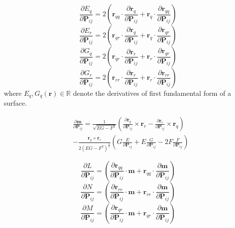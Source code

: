 \documentclass[journal]{IEEEtran}
\renewcommand{\vec}[1]{\mathbf{#1}}
\theoremstyle{definition}
\renewcommand{\vec}[1]{\mathbf{#1}}
\begin{document}
\begin{equation}
  \frac{\partial E_q}{\partial \mathbf{P}_{ij}} = 2\left(\mathbf{r}_{qq} \cdot \frac{\partial \mathbf{r}_{q}}{\partial \mathbf{P}_{ij}} + \mathbf{r}_{q} \cdot \frac{\partial \mathbf{r}_{qq}}{\partial \mathbf{P}_{ij}}\right)
\end{equation}
\begin{equation}
  \frac{\partial E_r}{\partial \mathbf{P}_{ij}} = 2\left(\mathbf{r}_{qr} \cdot \frac{\partial \mathbf{r}_{q}}{\partial \mathbf{P}_{ij}} + \mathbf{r}_{q} \cdot \frac{\partial \mathbf{r}_{qr}}{\partial \mathbf{P}_{ij}}\right)
\end{equation}
\begin{equation}
  \frac{\partial G_q}{\partial \mathbf{P}_{ij}} = 2\left(\mathbf{r}_{qr} \cdot \frac{\partial \mathbf{r}_{r}}{\partial \mathbf{P}_{ij}} + \mathbf{r}_{r} \cdot \frac{\partial \mathbf{r}_{qr}}{\partial \mathbf{P}_{ij}}\right)
\end{equation}
\begin{equation}
  \frac{\partial G_r}{\partial \mathbf{P}_{ij}} = 2\left(\mathbf{r}_{rr} \cdot \frac{\partial \mathbf{r}_{r}}{\partial \mathbf{P}_{ij}} + \mathbf{r}_{r} \cdot \frac{\partial \mathbf{r}_{rr}}{\partial \mathbf{P}_{ij}}\right)
\end{equation}
where $E_q,G_q(\vec{r})\in\mathbb{R}$ denote the derivatives of first fundamental form of a surface.

\begin{equation}
  \begin{split}
    &\frac{\partial \mathbf{m}}{\partial \mathbf{P}_{ij}} = \frac{1}{\sqrt{EG-F^2}} \left(\frac{\partial \mathbf{r}_{q} }{\partial \mathbf{P}_{ij}} \times \mathbf{r}_r - \frac{\partial \mathbf{r}_{r} }{\partial \mathbf{P}_{ij}} \times \mathbf{r}_q\right)\\
    & - \frac{\mathbf{r}_q \times \mathbf{r}_r}{2\left(EG-F^2\right)^{\frac{3}{2}}}  \left(G\frac{E}{\partial \mathbf{P}_{ij}} + E\frac{G}{\partial \mathbf{P}_{ij}} - 2F\frac{F}{\partial \mathbf{P}_{ij}}\right)
  \end{split}
\end{equation}


\begin{equation}
  \frac{\partial L}{\partial \mathbf{P}_{ij}} = \left(\frac{\partial \mathbf{r}_{qq}}{\partial \mathbf{P}_{ij}} \cdot \mathbf{m} + \mathbf{r}_{qq}\cdot \frac{\partial \mathbf{m}}{\partial \mathbf{P}_{ij}} \right)
\end{equation}
\begin{equation}
  \frac{\partial N}{\partial \mathbf{P}_{ij}} = \left(\frac{\partial \mathbf{r}_{rr}}{\partial \mathbf{P}_{ij}}\cdot \mathbf{m} + \mathbf{r}_{rr}\cdot \frac{\partial \mathbf{m}}{\partial \mathbf{P}_{ij}} \right)
\end{equation}
\begin{equation}
  \frac{\partial M}{\partial \mathbf{P}_{ij}} = \left(\frac{\partial \mathbf{r}_{qr}}{\partial \mathbf{P}_{ij}}\cdot \mathbf{m} + \mathbf{r}_{qr}\cdot \frac{\partial \mathbf{m}}{\partial \mathbf{P}_{ij}} \right)
\end{equation}
\end{document}

